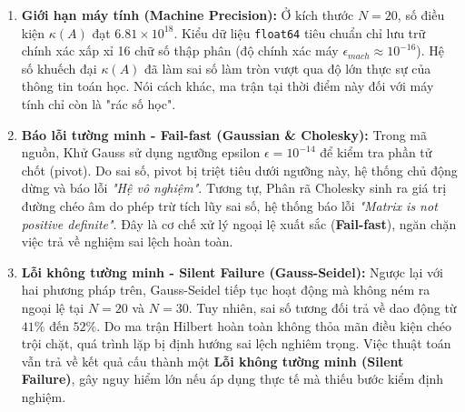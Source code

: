 \documentclass[12pt,a4paper]{article}
\begin{document}
\begin{enumerate}[label=\textbf{\alph*)}]
    \item \textbf{Giới hạn máy tính (Machine Precision):} 
    Ở kích thước $N=20$, số điều kiện $\kappa(A)$ đạt $6.81 \times 10^{18}$. Kiểu dữ liệu \texttt{float64} tiêu chuẩn chỉ lưu trữ chính xác xấp xỉ 16 chữ số thập phân (độ chính xác máy $\epsilon_{mach} \approx 10^{-16}$). Hệ số khuếch đại $\kappa(A)$ đã làm sai số làm tròn vượt qua độ lớn thực sự của thông tin toán học. Nói cách khác, ma trận tại thời điểm này đối với máy tính chỉ còn là "rác số học".
    
    \item \textbf{Báo lỗi tường minh - Fail-fast (Gaussian \& Cholesky):} 
    Trong mã nguồn, Khử Gauss sử dụng ngưỡng epsilon $\epsilon = 10^{-14}$ để kiểm tra phần tử chốt (pivot). Do sai số, pivot bị triệt tiêu dưới ngưỡng này, hệ thống chủ động dừng và báo lỗi \textit{"Hệ vô nghiệm"}. Tương tự, Phân rã Cholesky sinh ra giá trị đường chéo âm do phép trừ tích lũy sai số, hệ thống báo lỗi \textit{"Matrix is not positive definite"}. Đây là cơ chế xử lý ngoại lệ xuất sắc (\textbf{Fail-fast}), ngăn chặn việc trả về nghiệm sai lệch hoàn toàn.
    
    \item \textbf{Lỗi không tường minh - Silent Failure (Gauss-Seidel):} 
    Ngược lại với hai phương pháp trên, Gauss-Seidel tiếp tục hoạt động mà không ném ra ngoại lệ tại $N=20$ và $N=30$. Tuy nhiên, sai số tương đối trả về dao động từ $41\%$ đến $52\%$. Do ma trận Hilbert hoàn toàn không thỏa mãn điều kiện chéo trội chặt, quá trình lặp bị định hướng sai lệch nghiêm trọng. Việc thuật toán vẫn trả về kết quả cấu thành một \textbf{Lỗi không tường minh (Silent Failure)}, gây nguy hiểm lớn nếu áp dụng thực tế mà thiếu bước kiểm định nghiệm.
\end{enumerate}
\end{document}
